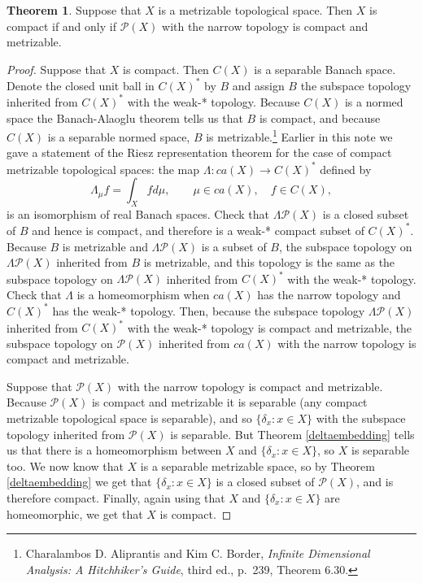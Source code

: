 \documentclass{article}
\theoremstyle{definition}
\newtheorem{theorem}{Theorem}
\theoremstyle{definition}
\begin{document}
\begin{theorem}
Suppose that $X$ is a metrizable topological space. Then $X$ is compact if and only if $\mathscr{P}(X)$ with the narrow topology is compact
and metrizable.
\label{Pcompact}
\end{theorem}
\begin{proof}
Suppose that $X$ is compact. Then $C(X)$ is a separable Banach space. Denote the closed unit ball
in $C(X)^*$ by $B$ and assign $B$ the subspace topology inherited from $C(X)^*$ with the weak-*
topology. Because $C(X)$ is a normed space
the Banach-Alaoglu theorem tells us that $B$
is  compact, and because $C(X)$ is a separable normed space,  
$B$ is metrizable.\footnote{Charalambos D. 
Aliprantis and Kim C. Border, {\em Infinite Dimensional Analysis: A Hitchhiker's Guide}, third ed., p.~239, Theorem 6.30.}
Earlier in this note we gave a statement of the Riesz representation theorem for the case of
compact metrizable topological spaces:  the map $\Lambda:ca(X) \to C(X)^*$ defined by
\[
\Lambda_\mu f = \int_X f d\mu, \qquad \mu \in ca(X), \quad f \in C(X),
\]
is an isomorphism of real Banach spaces. Check that $\Lambda \mathscr{P}(X)$ is a closed subset of $B$ and hence
is  compact, and therefore is a weak-* compact subset of $C(X)^*$. 
 Because  $B$  is metrizable and $\Lambda \mathscr{P}(X)$ is a subset of $B$, the subspace
topology on $\Lambda \mathscr{P}(X)$ inherited from $B$ is metrizable, and this topology is the same as the subspace
topology on $\Lambda \mathscr{P}(X)$ inherited from $C(X)^*$ with the weak-* topology. 
Check that $\Lambda$ is a homeomorphism  when $ca(X)$
has the narrow topology and $C(X)^*$ has the weak-* topology. 
Then, because the subspace topology $\Lambda \mathscr{P}(X)$ inherited from $C(X)^*$ with the weak-* topology
is compact and metrizable, the subspace topology on $\mathscr{P}(X)$ inherited from $ca(X)$ with the narrow topology
is compact and metrizable.

Suppose that $\mathscr{P}(X)$ with the narrow topology is compact and metrizable. 
Because $\mathscr{P}(X)$ is compact and metrizable it is separable (any compact metrizable topological space is separable), and so $\{\delta_x: x \in X\}$ with the subspace
topology inherited from $\mathscr{P}(X)$ is separable. 
But
Theorem \ref{deltaembedding} tells us that there is a homeomorphism between $X$ and $\{\delta_x: x \in X\}$,  so $X$ is separable too.  We now know that $X$ is a separable metrizable space, so by Theorem \ref{deltaembedding}
we get that $\{\delta_x : x \in X\}$ is a closed subset of $\mathscr{P}(X)$, and is therefore compact. Finally, again using
that $X$ and $\{\delta_x:x \in X\}$ are homeomorphic, we get that $X$ is compact.  
\end{proof}
\end{document}
